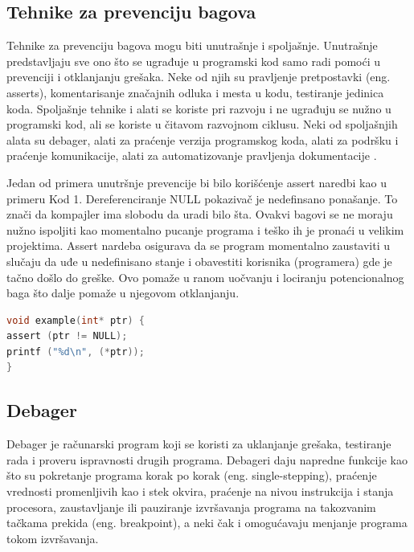 \documentclass[a4paper]{article}
\begin{document}
\subsection{Tehnike za prevenciju bagova}
\label{subsec:Tehnike za prevenciju bagova}

Tehnike za prevenciju bagova mogu biti unutrašnje i spoljašnje. Unutrašnje predstavljaju sve ono što se ugrađuje u programski kod samo radi pomoći u prevenciji i otklanjanju grešaka. Neke od njih su pravljenje pretpostavki (eng. asserts), komentarisanje značajnih odluka i mesta u kodu, testiranje jedinica koda. Spoljašnje tehnike i alati se koriste pri razvoju i ne ugrađuju se nužno u programski kod, ali se koriste u čitavom razvojnom ciklusu. Neki od spoljašnjih alata su debager, alati za praćenje verzija programskog koda, alati za podršku i praćenje komunikacije, alati za automatizovanje pravljenja dokumentacije \cite{bagovi_smalkov}.  

Jedan od primera unutršnje prevencije bi bilo korišćenje assert naredbi kao u primeru Kod 1. Dereferenciranje NULL pokazivač je nedefinsano ponašanje. To znači da kompajler ima slobodu da uradi bilo šta. Ovakvi bagovi se ne moraju nužno ispoljiti kao momentalno pucanje programa i teško ih je pronaći u velikim projektima. Assert nardeba osigurava da se program momentalno zaustaviti u slučaju da uđe u nedefinisano stanje i obavestiti korisnika (programera) gde je tačno došlo do greške. Ovo pomaže u ranom uočvanju i lociranju potencionalnog baga što dalje pomaže u njegovom otklanjanju.\\

\begin{lstlisting}[language=C,caption=Primer upotrebe assert naredbe]
void example(int* ptr) {
assert (ptr != NULL);
printf ("%d\n", (*ptr));
}
\end{lstlisting}


\subsection{Debager}
\label{subsec:Debager}

Debager je računarski program koji se koristi za uklanjanje grešaka, testiranje rada i proveru ispravnosti drugih programa. Debageri daju napredne funkcije kao što su pokretanje programa korak po korak (eng. single-stepping), praćenje vrednosti promenljivih kao i stek okvira, praćenje na nivou instrukcija i stanja procesora, zaustavljanje ili pauziranje izvršavanja programa na takozvanim tačkama prekida (eng. breakpoint), a neki čak i omogućavaju menjanje programa tokom izvršavanja.
\end{document}
